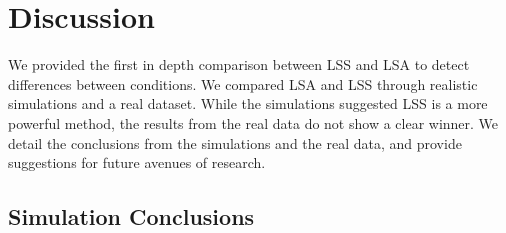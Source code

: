 \documentclass[10pt,letterpaper]{article}
\begin{document}



\section*{Discussion}
\label{discussion}

We provided the first in depth comparison between LSS and LSA to detect differences between conditions.
We compared LSA and LSS through realistic simulations and a real dataset.
While the simulations suggested LSS is a more powerful method,
the results from the real data do not show a clear winner.
We detail the conclusions from the simulations and the real data, and provide
suggestions for future avenues of research.

\subsection*{Simulation Conclusions}
\label{discussion:simulation-conclusions}
\end{document}
